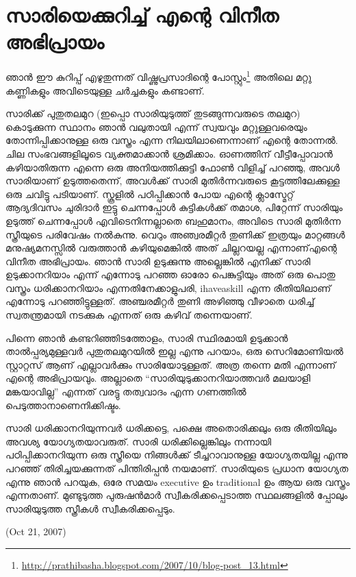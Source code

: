 \section*{സാരിയെക്കുറിച്ച് എന്റെ വിനീത അഭിപ്രായം}
\vskip 2pt


ഞാന്‍ ഈ കുറിപ്പ് എഴുതുന്നത് വിഷ്ണുപ്രസാദിന്റെ പോസ്റ്റും\footnote{\url{http://prathibasha.blogspot.com/2007/10/blog-post_13.html}} അതിലെ മറ്റു കണ്ണികളും അവിടെയുള്ള ചര്‍ച്ചകളും കണ്ടാണ്.

സാരിക്ക് പുതുതലമുറ (ഇപ്പൊ സാരിയുടുത്ത് തുടങ്ങുന്നവരുടെ തലമുറ) കൊടുക്കുന്ന സ്ഥാനം ഞാന്‍ വലുതായി എന്ന് സ്വയവും മറ്റുള്ളവരെയും തോന്നിപ്പിക്കാനുള്ള ഒരു വസ്ത്രം എന്ന നിലയിലാണെന്നാണ് എന്റെ തോന്നല്‍. ചില സംഭവങ്ങളിലൂടെ വ്യക്തമാക്കാന്‍ ശ്രമിക്കാം. ഓണത്തിന് വീട്ടീപ്പോവാന്‍ കഴിയാതിരുന്ന എന്നെ ഒരു അനിയത്തിക്കുട്ടി ഫോണ്‍ വിളിച്ച് പറഞ്ഞു, അവള്‍ സാരിയാണ് ഉടുത്തതെന്ന്, അവള്‍ക്ക് സാരി മുതിര്‍ന്നവരുടെ കൂട്ടത്തിലേക്കുള്ള ഒരു ചവിട്ടു പടിയാണ്. സ്കൂളില്‍ പഠിപ്പിക്കാന്‍ പോയ എന്റെ ക്ലാസ്മേറ്റ് ആദ്യദിവസം ചുരിദാര്‍ ഇട്ടു ചെന്നപ്പോള്‍ കുട്ടികള്‍ക്ക് തമാശ, പിറ്റേന്ന് സാരിയും ഉടുത്ത് ചെന്നപ്പോള്‍ എവിടെനിന്നല്ലാതെ ബഹുമാനം, അവിടെ സാരി മുതിര്‍ന്ന സ്ത്രീയുടെ പരിവേഷം നല്‍കുന്നു. വെറും അഞ്വരമീറ്റര്‍ തുണിക്ക് ഇത്രയും മാറ്റങ്ങള്‍ മനുഷ്യമനസ്സില്‍ വരുത്താന്‍ കഴിയുമെങ്കില്‍ അത് ചില്ലറയല്ല എന്നാണ്എന്റെ വിനീത അഭിപ്രായം. ഞാന്‍ സാരി ഉടുക്കുന്നു അല്ലെങ്കില്‍ എനിക്ക് സാരി ഉടുക്കാനറിയാം എന്ന് എന്നോടു പറഞ്ഞ ഓരോ പെങ്കുട്ടിയും അത് ഒരു പൊതു വസ്ത്രം ധരിക്കാനറിയാം എന്നതിനേക്കാളുപരി, ihaveaskill എന്ന രീതിയിലാണ് എന്നോടു പറഞ്ഞിട്ടുള്ളത്. അഞ്ചരമീറ്റര്‍ തുണി അഴിഞ്ഞു വീഴാതെ ധരിച്ച് സ്വതന്ത്രമായി നടക്കുക എന്നത് ഒരു കഴിവ് തന്നെയാണ്.

പിന്നെ ഞാന്‍ കണ്ടറിഞ്ഞിടത്തോളം, സാരി സ്ഥിരമായി ഉടുക്കാന്‍ താല്‍പ്പര്യമുള്ളവര്‍ പുതുതലമുറയില്‍ ഇല്ല എന്നു പറയാം, ഒരു സെറിമോണിയല്‍ സ്റ്റാറ്റസ് ആണ് എല്ലാവര്‍ക്കും സാരിയോടുള്ളത്. അത്ര തന്നെ മതി എന്നാണ് എന്റെ അഭിപ്രായവും. അല്ലാതെ “സാരിയുടുക്കാനറിയാത്തവര്‍ മലയാളി മങ്കയാവില്ല” എന്നത് വരട്ടു തത്വവാദം എന്ന ഗണത്തില്‍ പെടുത്താനാണെനിക്കിഷ്ടം.

സാരി ധരിക്കാനറിയുന്നവര്‍ ധരിക്കട്ടെ, പക്ഷെ അതൊരിക്കലും ഒരു രീതിയിലും അവശ്യ യോഗ്യതയാവരുത്. സാരി ധരിക്കില്ലെങ്കിലും നന്നായി പഠിപ്പിക്കാനറിയുന്ന ഒരു സ്ത്രീയെ നിങ്ങള്‍ക്ക് ടീച്ചറാവാനുള്ള യോഗ്യതയില്ല എന്നു പറഞ്ഞ് തിരിച്ചയക്കുന്നത് പിന്തിരിപ്പന്‍ നയമാണ്. സാരിയുടെ പ്രധാന യോഗ്യത എന്നു ഞാന്‍ പറയുക, ഒരേ സമയം executive ഉം traditional ഉം ആയ ഒരു വസ്ത്രം എന്നതാണ്. മുണ്ടുടുത്ത പുരുഷന്‍മാര്‍ സ്വീകരിക്കപ്പെടാത്ത സ്ഥലങ്ങളില്‍ പ്പോലും സാരിയുടുത്ത സ്ത്രീകള്‍ സ്വീകരിക്കപ്പെടും.

(Oct 21, 2007)
\newpage
